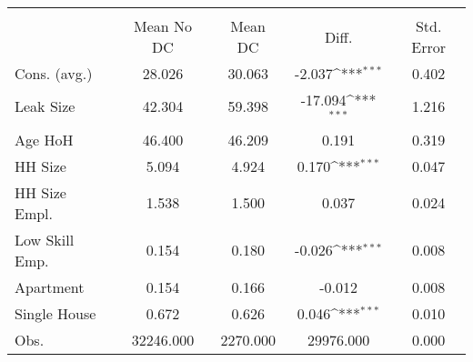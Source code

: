 {
\def\sym#1{\ifmmode^{#1}\else\(^{#1}\)\fi}
\begin{tabular}{l*{1}{cccc}}
\hline\hline
                    &\multicolumn{4}{c}{}                                        \\
                    &  Mean No DC&     Mean DC&       Diff.         &  Std. Error\\
\hline
Cons. (avg.)        &      28.026&      30.063&      -2.037\sym{***}&       0.402\\
Leak Size           &      42.304&      59.398&     -17.094\sym{***}&       1.216\\
Age HoH             &      46.400&      46.209&       0.191         &       0.319\\
HH Size             &       5.094&       4.924&       0.170\sym{***}&       0.047\\
HH Size Empl.       &       1.538&       1.500&       0.037         &       0.024\\
Low Skill Emp.      &       0.154&       0.180&      -0.026\sym{***}&       0.008\\
Apartment           &       0.154&       0.166&      -0.012         &       0.008\\
Single House        &       0.672&       0.626&       0.046\sym{***}&       0.010\\
Obs.                &   32246.000&    2270.000&   29976.000         &       0.000\\
\hline\hline
\end{tabular}
}
